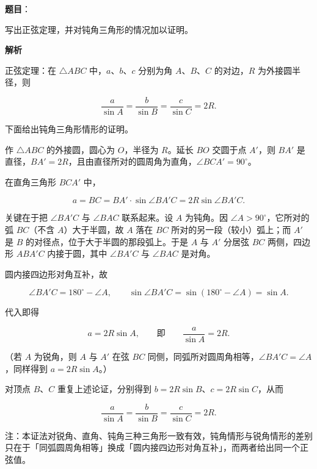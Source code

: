 \begin{answer}

\textbf{题目}：

写出正弦定理，并对钝角三角形的情况加以证明。

\textbf{解析}

正弦定理：在 $\triangle ABC$ 中，$a$、$b$、$c$ 分别为角 $A$、$B$、$C$ 的对边，$R$ 为外接圆半径，则

\nopagebreak[4]
\[
\frac a{\sin A}=\frac b{\sin B}=\frac c{\sin C}=2R.
\]

下面给出钝角三角形情形的证明。

作 $\triangle ABC$ 的外接圆，圆心为 $O$，半径为 $R$。延长 $BO$ 交圆于点 $A'$，则 $BA'$ 是直径，$BA'=2R$，且由直径所对的圆周角为直角，$\angle BCA'=90^\circ$。

在直角三角形 $BCA'$ 中，

\nopagebreak[4]
\[
a=BC=BA'\cdot\sin\angle BA'C=2R\sin\angle BA'C.
\]

关键在于把 $\angle BA'C$ 与 $\angle BAC$ 联系起来。设 $A$ 为钝角。因 $\angle A>90^\circ$，它所对的弧 $BC$（不含 $A$）大于半圆，故 $A$ 落在 $BC$ 所对的另一段（较小）弧上；而 $A'$ 是 $B$ 的对径点，位于大于半圆的那段弧上。于是 $A$ 与 $A'$ 分居弦 $BC$ 两侧，四边形 $ABA'C$ 内接于圆，其中 $\angle BA'C$ 与 $\angle BAC$ 是对角。

圆内接四边形对角互补，故

\nopagebreak[4]
\[
\angle BA'C=180^\circ-\angle A,\qquad \sin\angle BA'C=\sin(180^\circ-\angle A)=\sin A.
\]

代入即得

\nopagebreak[4]
\[
a=2R\sin A,\qquad\text{即}\qquad \frac a{\sin A}=2R.
\]

（若 $A$ 为锐角，则 $A$ 与 $A'$ 在弦 $BC$ 同侧，同弧所对圆周角相等，$\angle BA'C=\angle A$，同样得到 $a=2R\sin A$。）

对顶点 $B$、$C$ 重复上述论证，分别得到 $b=2R\sin B$、$c=2R\sin C$，从而

\nopagebreak[4]
\[
\frac a{\sin A}=\frac b{\sin B}=\frac c{\sin C}=2R.
\]

注：本证法对锐角、直角、钝角三种三角形一致有效，钝角情形与锐角情形的差别只在于「同弧圆周角相等」换成「圆内接四边形对角互补」，而两者给出同一个正弦值。


\end{answer}
